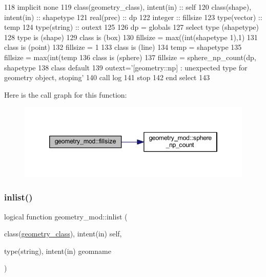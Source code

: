 \begin{DoxyCode}
118     \textcolor{keywordtype}{implicit none}
119     \textcolor{keywordtype}{class}(geometry\_class), \textcolor{keywordtype}{intent(in)} :: self
120     \textcolor{keywordtype}{class}(shape), \textcolor{keywordtype}{intent(in)} :: shapetype
121     \textcolor{keywordtype}{real(prec)} :: dp
122     \textcolor{keywordtype}{integer} :: fillsize
123     \textcolor{keywordtype}{type}(vector) :: temp
124     \textcolor{keywordtype}{type}(string) :: outext
125 
126     dp = globals%
127     \textcolor{keywordflow}{select type} (shapetype)
128 \textcolor{keywordflow}{    type is} (shape)
129 \textcolor{keywordflow}{    class is} (box)
130         fillsize = max((int(shapetype%
      1),1)
131 \textcolor{keywordflow}{    class is} (point)
132         fillsize = 1
133 \textcolor{keywordflow}{    class is} (line)
134         temp = shapetype%
135         fillsize = max(int(temp%
136 \textcolor{keywordflow}{    class is} (sphere)
137         fillsize = sphere\_np\_count(dp, shapetype%
138 \textcolor{keywordflow}{        class default}
139         outext=\textcolor{stringliteral}{'[geometry::np] : unexpected type for geometry object, stoping'}
140         \textcolor{keyword}{call }log%
141         stop
142 \textcolor{keywordflow}{    end select}
143 
\end{DoxyCode}
Here is the call graph for this function\+:\nopagebreak
\begin{figure}[H]
\begin{center}
\leavevmode
\includegraphics[width=346pt]{namespacegeometry__mod_a92602e1198d3607613ea2722fb002685_cgraph}
\end{center}
\end{figure}
\mbox{\label{namespacegeometry__mod_a22dd77024fce56da299445a697256155}} 
\subsubsection{\texorpdfstring{inlist()}{inlist()}}
{\footnotesize\ttfamily logical function geometry\+\_\+mod\+::inlist (\begin{DoxyParamCaption}\item[{class(\mbox{\hyperlink{structgeometry__mod_1_1geometry__class}{geometry\+\_\+class}}), intent(in)}]{self,  }\item[{type(string), intent(in)}]{geomname }\end{DoxyParamCaption})\hspace{0.3cm}{\ttfamily [private]}}



